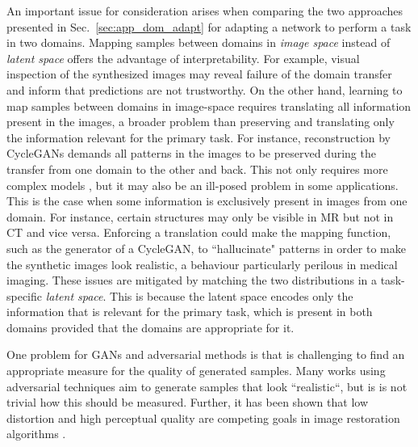 \documentclass{article}
\begin{document}
An important issue for consideration arises when comparing the two approaches presented in Sec.~\ref{sec:app_dom_adapt} for adapting a network to perform a task in two domains. Mapping samples between domains in \emph{image space} instead of \emph{latent space} offers the advantage of interpretability. For example, visual inspection of the synthesized images may reveal failure of the domain transfer and inform that predictions are not trustworthy. 
On the other hand, learning to map samples between domains in image-space requires translating all information present in the images, a broader problem than preserving and translating only the information relevant for the primary task. 
For instance, reconstruction by CycleGANs demands all patterns in the images to be preserved during the transfer from one domain to the other and back. 
This not only requires more complex models \cite{chen2018semantic,huo2018adversarial}, but it may also be an ill-posed problem in some applications. 
This is the case when some information is exclusively present in images from one domain. For instance, certain structures may only be visible in MR but not in CT and vice versa. Enforcing a translation could make the mapping function, such as the generator of a CycleGAN, to ``hallucinate" patterns in order to make the synthetic images look realistic, a behaviour particularly perilous in medical imaging. These issues are mitigated by matching the two distributions in a task-specific \emph{latent space}. This is because the latent space encodes only the information that is relevant for the primary task, which is present in both domains provided that the domains are appropriate for it.

One problem for GANs and adversarial methods is that is challenging to find an appropriate measure for the quality of generated samples. Many works using adversarial techniques aim to generate samples that look ``realistic``, but is is not trivial how this should be measured. Further, it has been shown that low distortion and high perceptual quality are competing goals in image restoration algorithms \cite{Blau18}. 
\end{document}
